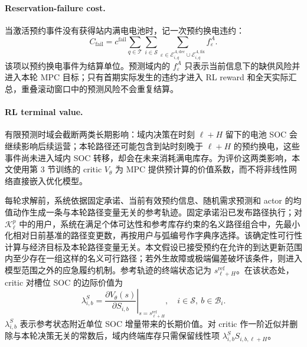 \documentclass[12pt,a4paper,UTF8]{ctexart}
\begin{document}
\paragraph{Reservation-failure cost.}
当激活预约事件没有获得站内满电电池时，记一次预约换电违约：
\begin{equation}
C_{\mathrm{fail}}
=c^{\mathrm{fail}}
\sum_{q\in\mathcal T}\sum_{i\in\mathcal S}
\sum_{\varepsilon\in
\mathcal E_{i,q}^{A,\mathrm{dec}}\cup
\mathcal E_{i,q}^{A,\mathrm{fix}}}
f_\varepsilon^A.
\label{eq:reservation_failure_cost}
\end{equation}
该项以预约换电事件为结算单位。预测域内的 $f_\varepsilon^A$ 只表示当前信息下的缺供风险并进入本轮 MPC 目标；只有首期实际发生的违约才进入 RL reward 和全天实际汇总，重叠滚动窗口中的预测风险不会重复结算。

\paragraph{RL terminal value.}
有限预测时域会截断两类长期影响：域内决策在时刻 $\ell+H$ 留下的电池 SOC 会继续影响后续运营；本轮路径还可能包含到站时刻晚于 $\ell+H$ 的预约换电，这些事件尚未进入域内 SOC 转移，却会在未来消耗满电库存。为评价这两类影响，本文使用第 3 节训练的 critic $V_\theta$ 为 MPC 提供预计算的价值系数，而不将非线性网络直接嵌入优化模型。

每轮求解前，系统依据固定承诺、当前有效预约信息、随机需求预测和 actor 的均值动作生成一条与本轮路径变量无关的参考轨迹。固定承诺沿已发布路径执行；对 $\mathcal K_\ell^p$ 中的用户，系统在满足个体可达性和参考库存约束的名义路径组合中，先最小化相对日前基准的路径变更数，再按用户与弧编号作字典序选择。该确定性可行性计算与经济目标及本轮路径变量无关。本文假设已接受预约在允许的到达更新范围内至少存在一组这样的名义可行路径；若外生故障或极端偏差破坏该条件，则进入模型范围之外的应急履约机制。参考轨迹的终端状态记为 $s_{\ell+H}^{\mathrm{ref}}$。在该状态处，critic 对槽位 SOC 的边际价值为
\begin{equation}
\lambda^S_{i,b}
=
\left.
\frac{\partial V_{\theta}(s)}
{\partial S_{i,b}}
\right|_{s=s_{\ell+H}^{\mathrm{ref}}},
\quad i\in\mathcal S,\ b\in\mathcal B_i.
\label{eq:marginal_value_soc}
\end{equation}
$\lambda^S_{i,b}$ 表示参考状态附近单位 SOC 增量带来的长期价值。对 critic 作一阶近似并删除与本轮决策无关的常数后，域内终端库存只需保留线性项 $\lambda^S_{i,b}S_{i,b,\ell+H}$。
\end{document}
